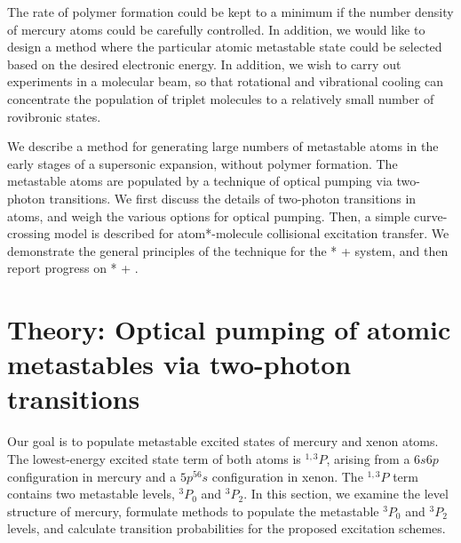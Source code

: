 \documentclass[12pt]{mitthesis}
\begin{document}
The rate of polymer formation could be kept to a minimum if the number
density of mercury atoms could be carefully controlled.  In addition,
we would like to design a method where the particular atomic
metastable state could be selected based on the desired electronic
energy.  In addition, we wish to carry out experiments in a molecular
beam, so that rotational and vibrational cooling can concentrate the
population of triplet molecules to a relatively small number of
rovibronic states.

We describe a method for generating large numbers of metastable atoms
in the early stages of a supersonic expansion, without polymer
formation.  The metastable atoms are populated by a technique of
optical pumping via two-photon transitions.  We first discuss the
details of two-photon transitions in atoms, and weigh the various
options for optical pumping.  Then, a simple curve-crossing model is
described for atom*-molecule collisional excitation transfer.  We
demonstrate the general principles of the technique for the * +
 system, and then report progress on * + .

\section{Theory: Optical pumping of atomic metastables via two-photon
  transitions}

Our goal is to populate metastable excited states of mercury and xenon
atoms.  The lowest-energy excited state term of both atoms is
$^{1,3}P$, arising from a $6s6p$ configuration in mercury and a
$5p^56s$ configuration in xenon.  The $^{1,3}P$ term contains two
metastable levels, $^3P_0$ and $^3P_2$.  In this section, we examine
the level structure of mercury, formulate methods to populate the
metastable $^3P_0$ and $^3P_2$ levels, and calculate transition
probabilities for the proposed excitation schemes.
\end{document}
